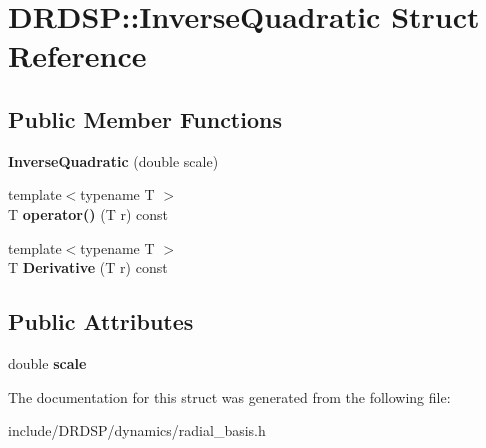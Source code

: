 \hypertarget{struct_d_r_d_s_p_1_1_inverse_quadratic}{\section{D\-R\-D\-S\-P\-:\-:Inverse\-Quadratic Struct Reference}
\label{struct_d_r_d_s_p_1_1_inverse_quadratic}
}
\subsection*{Public Member Functions}
\begin{DoxyCompactItemize}
\item 
\hypertarget{struct_d_r_d_s_p_1_1_inverse_quadratic_a4a7714fcbafbaec4bb30c6922feb59e1}{{\bfseries Inverse\-Quadratic} (double scale)}\label{struct_d_r_d_s_p_1_1_inverse_quadratic_a4a7714fcbafbaec4bb30c6922feb59e1}

\item 
\hypertarget{struct_d_r_d_s_p_1_1_inverse_quadratic_a24a735561bee7c360ee1d1d86126fdad}{{\footnotesize template$<$typename T $>$ }\\T {\bfseries operator()} (T r) const }\label{struct_d_r_d_s_p_1_1_inverse_quadratic_a24a735561bee7c360ee1d1d86126fdad}

\item 
\hypertarget{struct_d_r_d_s_p_1_1_inverse_quadratic_af57547e80e67331d04526fbb98d9bc2c}{{\footnotesize template$<$typename T $>$ }\\T {\bfseries Derivative} (T r) const }\label{struct_d_r_d_s_p_1_1_inverse_quadratic_af57547e80e67331d04526fbb98d9bc2c}

\end{DoxyCompactItemize}
\subsection*{Public Attributes}
\begin{DoxyCompactItemize}
\item 
\hypertarget{struct_d_r_d_s_p_1_1_inverse_quadratic_a31241ecd1ec571b651307d29e6b69c07}{double {\bfseries scale}}\label{struct_d_r_d_s_p_1_1_inverse_quadratic_a31241ecd1ec571b651307d29e6b69c07}

\end{DoxyCompactItemize}


The documentation for this struct was generated from the following file\-:\begin{DoxyCompactItemize}
\item 
include/\-D\-R\-D\-S\-P/dynamics/radial\-\_\-basis.\-h\end{DoxyCompactItemize}

